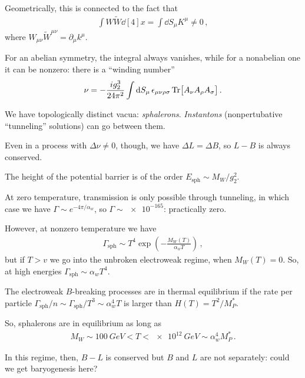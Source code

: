 \documentclass[main.tex]{subfiles}
\begin{document}
Geometrically, this is connected to the fact that 
%
\begin{align}
\int W \widetilde{W} \dd[4]{x} = \int \dd{S_{\mu }} K^{\mu } \neq 0
\,,
\end{align}
%
where \(W_{\mu \nu } \widetilde{W}^{\mu \nu } = \partial_{\mu } k^{\mu }\).

For an abelian symmetry, the integral always vanishes, while for a nonabelian one it can be nonzero: there is a ``winding number'' 
%
\begin{align}
\nu = - \frac{i g_2^3}{24 \pi^2} \int \dd{S_\mu } \epsilon_{\mu \nu \rho \sigma } \Tr[A_{\nu }A_{\rho }A_{\sigma }]
\,.
\end{align}

We have topologically distinct vacua: \emph{sphalerons}. \emph{Instantons} (nonpertubative ``tunneling'' solutions) can go between them. 

Even in a process with \(\Delta \nu \neq 0\), though, we have \(\Delta L = \Delta B\), so \(L-B\) is always conserved. 

The height of the potential barrier is of the order \(E _{\text{sph}} \sim M_W / g_2^2\). 

At zero temperature, transmission is only possible through tunneling, in which case we have \(\Gamma \sim e^{-4 \pi / \alpha_{w}}\), so \(\Gamma \sim \num{e-165}\): practically zero. 

However, at nonzero temperature we have 
%
\begin{align}
\Gamma _{\text{sph}} \sim T^{4} \exp( - \frac{M_W(T)}{\alpha_{w} T})
\,,
\end{align}
%
but if \(T > v\) we go into the unbroken electroweak regime, when \(M_W(T ) = 0\). So, at high energies \(\Gamma _{\text{sph}} \sim \alpha_{w} T^{4}\). 


The electroweak \(B\)-breaking processes are in thermal equilibrium if the rate per particle \(\Gamma _{\text{sph}} / n \sim \Gamma _{\text{sph}} / T^3 \sim \alpha_w^{4} T\) is larger than \(H(T) = T^2 / M_P^{*}\). 


So, sphalerons are in equilibrium as long as 
%
\begin{align}
M_W \sim \SI{100}{GeV} < T < \SI{e12}{GeV} \sim \alpha_w^{4}M_P^{*}
\,.
\end{align}

In this regime, then, \(B-L\) is conserved but \(B\) and \(L\) are not separately: could we get baryogenesis here? 
\end{document}
